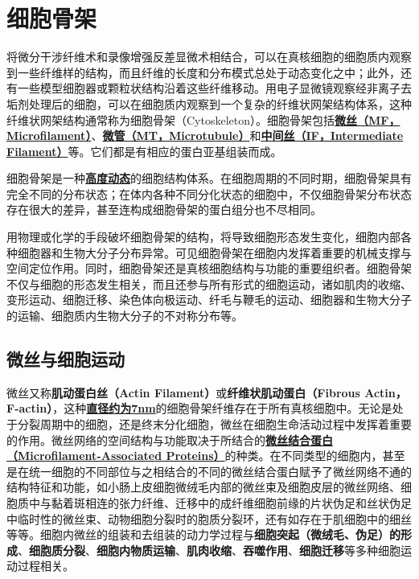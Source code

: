 \chapter{细胞骨架}

将微分干涉纤维术和录像增强反差显微术相结合，可以在真核细胞的细胞质内观察到一些纤维样的结构，而且纤维的长度和分布模式总处于动态变化之中；此外，还有一些模型细胞器或颗粒状结构沿着这些纤维移动。用电子显微镜观察经非离子去垢剂处理后的细胞，可以在细胞质内观察到一个复杂的纤维状网架结构体系，这种纤维状网架结构通常称为细胞骨架（Cytoskeleton）。细胞骨架包括\textbf{\underline{微丝（MF，Microfilament）}}、\textbf{\underline{微管（MT，Microtubule）}}和\textbf{\underline{中间丝（IF，Intermediate Filament）}}等。它们都是有相应的蛋白亚基组装而成。

细胞骨架是一种\textbf{\underline{高度动态}}的细胞结构体系。在细胞周期的不同时期，细胞骨架具有完全不同的分布状态；在体内各种不同分化状态的细胞中，不仅细胞骨架分布状态存在很大的差异，甚至连构成细胞骨架的蛋白组分也不尽相同。

用物理或化学的手段破坏细胞骨架的结构，将导致细胞形态发生变化，细胞内部各种细胞器和生物大分子分布异常。可见细胞骨架在细胞内发挥着重要的机械支撑与空间定位作用。同时，细胞骨架还是真核细胞结构与功能的重要组织者。细胞骨架不仅与细胞的形态发生相关，而且还参与所有形式的细胞运动，诸如肌肉的收缩、变形运动、细胞迁移、染色体向极运动、纤毛与鞭毛的运动、细胞器和生物大分子的运输、细胞质内生物大分子的不对称分布等。

\section{微丝与细胞运动}

微丝又称\textbf{肌动蛋白丝（Actin Filament）}或\textbf{纤维状肌动蛋白（Fibrous Actin，F-actin）}，这种\textbf{\underline{直径约为7nm}}的细胞骨架纤维存在于所有真核细胞中。无论是处于分裂周期中的细胞，还是终末分化细胞，微丝在细胞生命活动过程中发挥着重要的作用。微丝网络的空间结构与功能取决于所结合的\textbf{\underline{微丝结合蛋白（Microfilament-Associated Proteins）}}的种类。在不同类型的细胞内，甚至是在统一细胞的不同部位与之相结合的不同的微丝结合蛋白赋予了微丝网络不通的结构特征和功能，如小肠上皮细胞微绒毛内部的微丝束及细胞皮层的微丝网络、细胞质中与黏着斑相连的张力纤维、迁移中的成纤维细胞前缘的片状伪足和丝状伪足中临时性的微丝束、动物细胞分裂时的胞质分裂环，还有如存在于肌细胞中的细丝等等。细胞内微丝的组装和去组装的动力学过程与\textbf{细胞突起（微绒毛、伪足）的形成}、\textbf{细胞质分裂}、\textbf{细胞内物质运输}、\textbf{肌肉收缩}、\textbf{吞噬作用}、\textbf{细胞迁移}等多种细胞运动过程相关。

